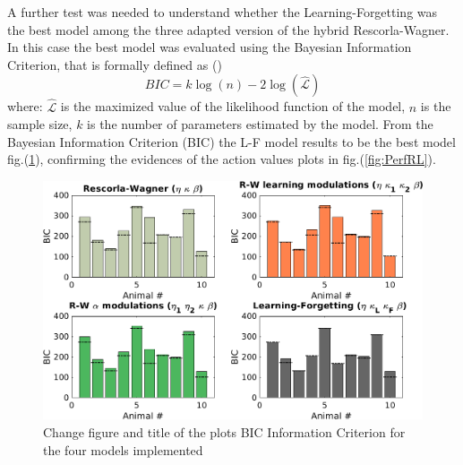 A further test was needed to understand whether the Learning-Forgetting was the best model among the three adapted version of the hybrid Rescorla-Wagner. In this case the best model was evaluated using the Bayesian Information Criterion, that is formally defined as (\cite{Schwarz})
\begin{equation}
    BIC=k\log(n)-2\log(\hat{\mathcal{L}})
\end{equation}
where:
${\hat{\mathcal{L}}}$ is the maximized value of the likelihood function of the model, $n$ is the sample size, $k$ is the number of parameters estimated by the model.
From the Bayesian Information Criterion (BIC) the L-F model results to be the best model fig.(\ref{fig:BIC}), confirming the evidences of the action values plots in fig.(\ref{fig:PerfRL}).
\begin{figure}
    \centering
    \includegraphics[scale=0.6]{figures/BIC_ModelCompare.png}
    \caption{{\color{red}Change figure and title of the plots} BIC Information Criterion for the four models implemented}
    \label{fig:BIC}
\end{figure}
